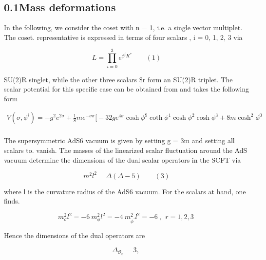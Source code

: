 \documentclass{article}
\begin{document}
\sloppy

\subsection*{0.1Mass deformations}


In the following, we consider the coset with n = 1, i.e. a single vector multiplet. The coset.
representative is expressed in terms of four scalars , i = 0, 1, 2, 3 via


\begin{equation}
L = \prod _ { i = 0 } ^ { 3 } e ^ { \phi ^ { i } K ^ { * } } \qquad ( 1 )
\end{equation}


SU(2)R singlet, while the other three scalars \$r form an SU(2)R triplet. The scalar potential
for this specific case can be obtained from and takes the following form


\begin{equation}
\begin{array} { r } { V ( \sigma, \phi ^ { i } ) = - g ^ { 2 } e ^ { 2 \sigma } + \frac { 1 } { 8 } m e ^ { - \sigma \sigma } \bigg [ - 3 2 g e ^ { 4 \sigma } \cosh \phi ^ { 9 } \coth \phi ^ { 1 } \cosh \phi ^ { 2 } \cosh \phi ^ { 3 } + 8 m \cosh ^ { 2 } \phi ^ { 0 } } \\ { \qquad }\end{array}
\end{equation}


The supersymmetric AdS6 vacuum is given by setting g = 3m and setting all scalars to.
vanish. The masses of the linearized scalar fluctuation around the AdS vacuum determine
the dimensions of the dual scalar operators in the SCFT via


\begin{equation}
m ^ { 2 } l ^ { 2 } = \Delta ( \Delta - 5 ) \qquad ( 3 )
\end{equation}


where l is the curvature radius of the AdS6 vacuum. For the scalars at hand, one finds.


\begin{equation}
m _ { \sigma } ^ { 2 } l ^ { 2 } = - 6 ~ m _ { \phi } ^ { 2 } l ^ { 2 } = - 4 ~ m _ { \phi ^ { \prime } } ^ { 2 } l ^ { 2 } = - 6 ~, ~ ~ r = 1, 2, 3 ~
\end{equation}


Hence the dimensions of the dual operators are


\begin{equation}
\Delta _ { \mathcal { O } _ { \varphi } } = 3, ~
\end{equation}
\end{document}
